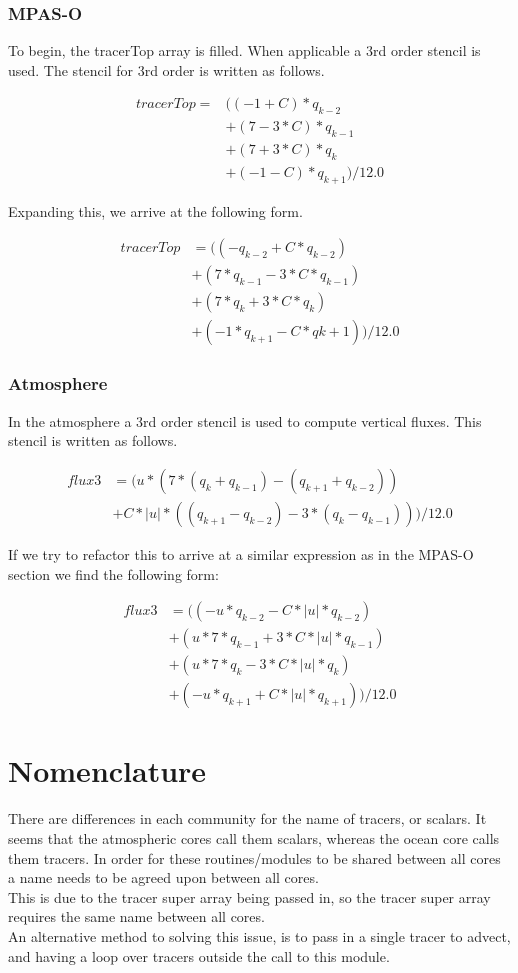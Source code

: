 \documentclass[11pt]{report}
\begin{document}
\subsubsection{MPAS-O}
To begin, the tracerTop array is filled. When applicable a 3rd order stencil is used. The stencil for 3rd order is written as follows.

\begin{align*}
	tracerTop = &((-1 + C) * q_{k-2} \\
	            &+(7- 3*C) * q_{k-1} \\
				&+(7+ 3*C) * q_{k} \\
				&+(-1 - C) * q_{k+1})/12.0
\end{align*}

Expanding this, we arrive at the following form.

\begin{align*}
	tracerTop &= ((-q_{k-2} + C*q_{k-2}) \\
		       &+ (7*q_{k-1} - 3*C*q_{k-1}) \\
			   &+ (7*q_{k} + 3 * C * q_{k}) \\
			   &+ (-1 * q_{k+1} - C*q{k+1}))/12.0
\end{align*}

\subsubsection{Atmosphere}
In the atmosphere a 3rd order stencil is used to compute vertical fluxes. This stencil is written as follows.

\begin{align*}
	flux3 &= (u * (7 * (q_{k} + q_{k-1}) - (q_{k+1} + q_{k-2})) \\
		  &+C * |u| *((q_{k+1}-q_{k-2}) - 3 * (q_{k} - q_{k-1})))/12.0
\end{align*}

If we try to refactor this to arrive at a similar expression as in the MPAS-O section we find the following form:

\begin{align*}
	flux3 &= ((-u * q_{k-2} - C * |u| * q_{k-2}) \\
		  &+  ( u * 7 * q_{k-1} + 3 * C * |u| * q_{k-1}) \\
		  &+  ( u * 7 * q_{k}   - 3 * C * |u| * q_{k}) \\
		  &+  (-u * q_{k+1} + C * |u| * q_{k+1})) / 12.0
\end{align*}

\section{Nomenclature}
There are differences in each community for the name of tracers, or scalars. It seems that the atmospheric cores call them scalars, whereas the ocean core calls them tracers. In order for these routines/modules to be shared between all cores a name needs to be agreed upon between all cores. \\

This is due to the tracer super array being passed in, so the tracer super array requires the same name between all cores. \\

An alternative method to solving this issue, is to pass in a single tracer to advect, and having a loop over tracers outside the call to this module.
\end{document}
